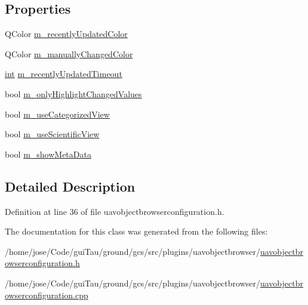 \subsection*{Properties}
\begin{DoxyCompactItemize}
\item 
Q\-Color \hyperlink{group___u_a_v_object_browser_plugin_ga37ba368816fa79530f01aa4447c2fc4d}{m\-\_\-recently\-Updated\-Color}
\item 
Q\-Color \hyperlink{group___u_a_v_object_browser_plugin_gaa3a9a8f01c4d49765d9134150e110f42}{m\-\_\-manually\-Changed\-Color}
\item 
\hyperlink{ioapi_8h_a787fa3cf048117ba7123753c1e74fcd6}{int} \hyperlink{group___u_a_v_object_browser_plugin_gabdd8aaa583badc5d3c7545480a372138}{m\-\_\-recently\-Updated\-Timeout}
\item 
bool \hyperlink{group___u_a_v_object_browser_plugin_ga71cd3f90f89aecf1db0e52927661c9f4}{m\-\_\-only\-Highlight\-Changed\-Values}
\item 
bool \hyperlink{group___u_a_v_object_browser_plugin_ga5e0ce819c5383cf9b01ec73c887f67f8}{m\-\_\-use\-Categorized\-View}
\item 
bool \hyperlink{group___u_a_v_object_browser_plugin_ga45e17799029628f880291ec2324473a5}{m\-\_\-use\-Scientific\-View}
\item 
bool \hyperlink{group___u_a_v_object_browser_plugin_ga6ae11b3871f2da133017aeffa97aaa0b}{m\-\_\-show\-Meta\-Data}
\end{DoxyCompactItemize}


\subsection{Detailed Description}


Definition at line 36 of file uavobjectbrowserconfiguration.\-h.



The documentation for this class was generated from the following files\-:\begin{DoxyCompactItemize}
\item 
/home/jose/\-Code/gui\-Tau/ground/gcs/src/plugins/uavobjectbrowser/\hyperlink{uavobjectbrowserconfiguration_8h}{uavobjectbrowserconfiguration.\-h}\item 
/home/jose/\-Code/gui\-Tau/ground/gcs/src/plugins/uavobjectbrowser/\hyperlink{uavobjectbrowserconfiguration_8cpp}{uavobjectbrowserconfiguration.\-cpp}\end{DoxyCompactItemize}
